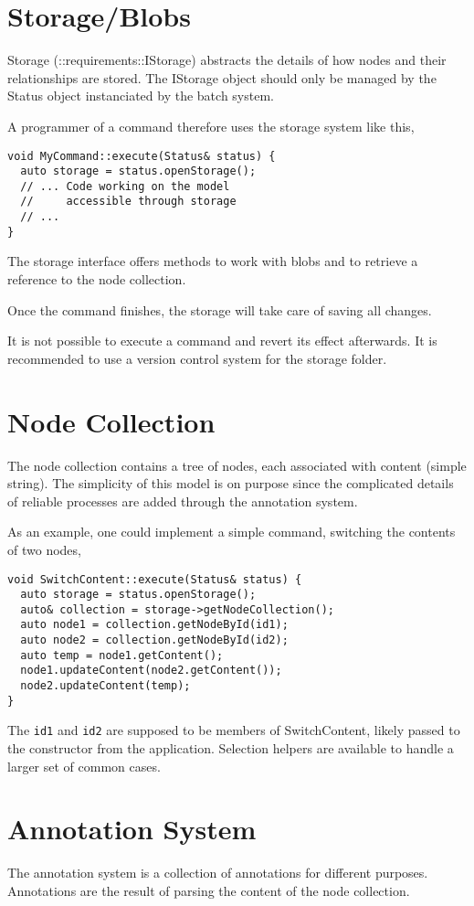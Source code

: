 \documentclass[12pt]{article}
\begin{document}
\section{Storage/Blobs}
Storage (::requirements::IStorage) abstracts the details of how nodes and their relationships are stored. The IStorage object should only be managed by the Status object instanciated by the batch system.

A programmer of a command therefore uses the storage system like this,
\begin{verbatim}
void MyCommand::execute(Status& status) {
  auto storage = status.openStorage();
  // ... Code working on the model
  //     accessible through storage
  // ...
}
\end{verbatim}

The storage interface offers methods to work with blobs and to retrieve a reference to the node collection.

Once the command finishes, the storage will take care of saving all changes.

It is not possible to execute a command and revert its effect afterwards.
It is recommended to use a version control system for the storage folder.

\section{Node Collection}
The node collection contains a tree of nodes, each associated with content (simple string). The simplicity of this model is on purpose since the complicated details of reliable processes are added through the annotation system.

As an example, one could implement a simple command, switching the contents of two nodes,
\begin{verbatim}
void SwitchContent::execute(Status& status) {
  auto storage = status.openStorage();
  auto& collection = storage->getNodeCollection();
  auto node1 = collection.getNodeById(id1);
  auto node2 = collection.getNodeById(id2);
  auto temp = node1.getContent();
  node1.updateContent(node2.getContent());
  node2.updateContent(temp);
}
\end{verbatim}

The \texttt{id1} and \texttt{id2} are supposed to be members of SwitchContent, likely passed to the constructor from the application. Selection helpers are available to handle a larger set of common cases.

\section{Annotation System}
The annotation system is a collection of annotations for different purposes.
Annotations are the result of parsing the content of the node collection.
\end{document}
